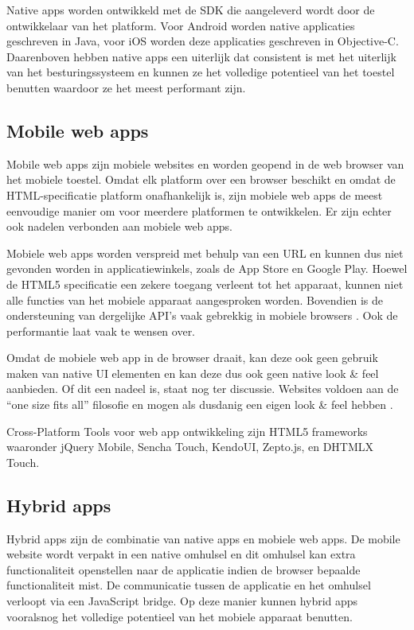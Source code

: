 \documentclass[a4paper]{IEEEconf}
\begin{document}
Native apps worden ontwikkeld met de SDK die aangeleverd wordt door de ontwikkelaar van het platform. Voor Android worden native applicaties geschreven in Java, voor iOS worden deze applicaties geschreven in Objective-C. Daarenboven hebben native apps een uiterlijk dat consistent is met het uiterlijk van het besturingssysteem en kunnen ze het volledige potentieel van het toestel benutten waardoor ze het meest performant zijn. 

\subsection{Mobile web apps}

Mobile web apps zijn mobiele websites en worden geopend in de web browser van het mobiele toestel. Omdat elk platform over een browser beschikt en omdat de HTML-specificatie platform onafhankelijk is, zijn mobiele web apps de meest eenvoudige manier om voor meerdere platformen te ontwikkelen. Er zijn echter ook nadelen verbonden aan mobiele web apps.

Mobiele web apps worden verspreid met behulp van een URL en kunnen dus niet gevonden worden in applicatiewinkels, zoals de App Store en Google Play. Hoewel de HTML5 specificatie een zekere toegang verleent tot het apparaat, kunnen niet alle functies van het mobiele apparaat aangesproken worden. Bovendien is de ondersteuning van dergelijke API's vaak gebrekkig in mobiele browsers \cite{MobileHTML5}. Ook de performantie laat vaak te wensen over.

Omdat de mobiele web app in de browser draait, kan deze ook geen gebruik maken van native UI elementen en kan deze dus ook geen native look \& feel aanbieden. Of dit een nadeel is, staat nog ter discussie. Websites voldoen aan de ``one size fits all'' filosofie en mogen als dusdanig een eigen look \& feel hebben \cite{Mahemoff:2011}.

Cross-Platform Tools voor web app ontwikkeling zijn HTML5 frameworks waaronder jQuery Mobile, Sencha Touch, KendoUI, Zepto.js, en DHTMLX Touch.

\subsection{Hybrid apps}

Hybrid apps zijn de combinatie van native apps en mobiele web apps. De mobile website wordt verpakt in een native omhulsel en dit omhulsel kan extra functionaliteit openstellen naar de applicatie indien de browser bepaalde functionaliteit mist. De communicatie tussen de applicatie en het omhulsel verloopt via een JavaScript bridge. Op deze manier kunnen hybrid apps vooralsnog het volledige potentieel van het mobiele apparaat benutten.
\end{document}

